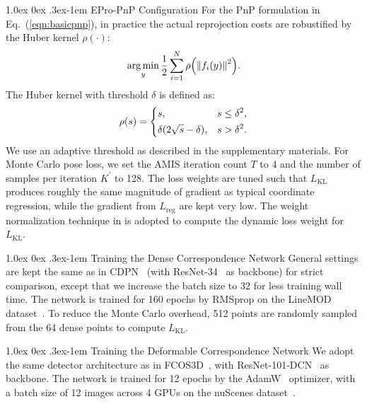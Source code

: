 \documentclass[10pt,twocolumn,letterpaper]{article}
\makeatletter
\let\originalleft\left
\let\originalright\right
\renewcommand{\left}{\mathopen{}\mathclose\bgroup\originalleft}
\renewcommand{\right}{\aftergroup\egroup\originalright}
\DeclareMathOperator*{\argmin}{arg\,min}
\renewcommand{\paragraph}{
  \@startsection{paragraph}{4}
  {\z@}{1.0ex \@plus 0ex \@minus .3ex}{-1em}
  {\normalfont\normalsize\bfseries}
}
\makeatother
\begin{document}
\paragraph{EPro-PnP Configuration} For the PnP formulation in Eq.~(\ref{eqn:basicpnp}), in practice the actual reprojection costs are robustified by the Huber kernel $\rho(\cdot)$:
\begin{equation}
\argmin_{y} \frac{1}{2} \sum_{i=1}^N \rho \left( \left\| f_i(y) \right\|^2 \right).
\label{eqn:robustpnp}
\end{equation}
The Huber kernel with threshold $\delta$ is defined as:
\begin{equation}
 \rho(s) = 
 \begin{dcases}
 s, & s \leq \delta^2,\\
 \delta(2 \sqrt{s} - \delta), & s > \delta^2.
 \end{dcases}
\label{eqn:huber}
\end{equation}
We use an adaptive threshold as described in the supplementary materials.
For Monte Carlo pose loss, we set the AMIS iteration count $T$ to 4 and the number of samples per iteration $K^\prime$ to 128. The loss weights are tuned such that $L_\text{KL}$ produces roughly the same magnitude of gradient as typical coordinate regression, while the gradient from $L_\text{reg}$ are kept very low. The weight normalization technique in \cite{monorun} is adopted to compute the dynamic loss weight for $L_\text{KL}$.


\paragraph{Training the Dense Correspondence Network} 
General settings are kept the same as in CDPN~\cite{CDPN} (with ResNet-34~\cite{resnet} as backbone) for strict comparison, except that we increase the batch size to 32 for less training wall time.
The network is trained for 160 epochs by RMSprop on the LineMOD dataset~\cite{linemod}. To reduce the Monte Carlo overhead, 512 points are randomly sampled from the 64 dense points to compute $L_\text{KL}$.


\paragraph{Training the Deformable Correspondence Network} We adopt the same detector architecture as in FCOS3D~\cite{fcos3d}, with ResNet-101-DCN~\cite{dcn} as backbone.
The network is trained for 12 epochs by the AdamW~\cite{adamw} optimizer, with a batch size of 12 images across 4 GPUs on the nuScenes dataset~\cite{nuscenes}.
\end{document}
